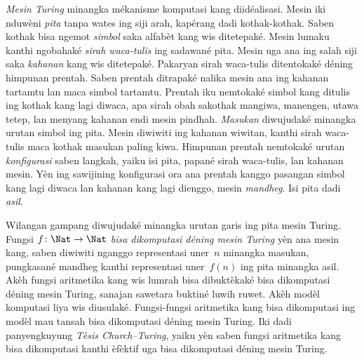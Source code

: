 \emph{Mesin Turing} minangka mékanisme komputasi kang
diidéalisasi. Mesin iki nduwèni \emph{pita} tanpa wates ing
siji arah, kapérang dadi kothak-kothak. Saben kothak bisa ngemot
\emph{simbol} saka alfabèt kang wis ditetepaké. Mesin lumaku
kanthi ngobahaké \emph{sirah waca-tulis} ing sadawané pita.
Mesin uga ana ing salah siji saka \emph{kahanan} kang wis
ditetepaké. Pakaryan sirah waca-tulis ditentokaké déning
himpunan prentah. Saben prentah ditrapaké nalika mesin ana
ing kahanan tartamtu lan maca simbol tartamtu. Prentah iku
nemtokaké simbol kang ditulis ing kothak kang lagi diwaca,
apa sirah obah sakothak mangiwa, manengen, utawa tetep, lan
menyang kahanan endi mesin pindhah. \emph{Masukan} diwujudaké
minangka urutan simbol ing pita. Mesin diwiwiti ing kahanan
wiwitan, kanthi sirah waca-tulis maca kothak masukan paling
kiwa. Himpunan prentah nemtokaké urutan \emph{konfigurasi}
saben langkah, yaiku isi pita, papané sirah waca-tulis, lan
kahanan mesin. Yèn ing sawijining konfigurasi ora ana
prentah kanggo pasangan simbol kang lagi diwaca lan kahanan
kang lagi dienggo, mesin \emph{mandheg}. Isi pita dadi
\emph{asil}.

Wilangan gampang diwujudaké minangka urutan garis ing pita
mesin Turing. Fungsi $f\colon\Nat\to\Nat$ \emph{bisa
dikomputasi déning mesin Turing} yèn ana mesin kang, saben
diwiwiti nganggo representasi uner~$n$ minangka masukan,
pungkasané mandheg kanthi representasi uner~$f(n)$ ing pita
minangka asil. Akèh fungsi aritmetika kang wis lumrah bisa
dibuktèkaké bisa dikomputasi déning mesin Turing, sanajan
sawetara buktiné luwih ruwet. Akèh modèl komputasi liya wis
diusulaké. Fungsi-fungsi aritmetika kang bisa dikomputasi ing
modèl mau tansah bisa dikomputasi déning mesin Turing.
Iki dadi panyengkuyung \emph{Tèsis Church--Turing}, yaiku yèn
saben fungsi aritmetika kang bisa dikomputasi kanthi èfèktif
uga bisa dikomputasi déning mesin Turing.
